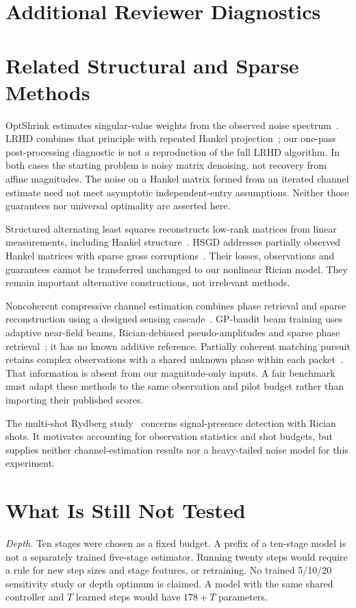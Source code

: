 \documentclass[journal]{IEEEtran}
\begin{document}
\section{Additional Reviewer Diagnostics}


\section{Related Structural and Sparse Methods}
OptShrink estimates singular-value weights from the observed noise
spectrum~\cite{nadakuditi2014}. LRHD combines that principle with
repeated Hankel projection~\cite{yin2021}; our one-pass post-processing
diagnostic is not a reproduction of the full LRHD algorithm. In both
cases the starting problem is noisy matrix denoising, not recovery from
affine magnitudes. The noise on a Hankel matrix formed from an iterated
channel estimate need not meet asymptotic independent-entry assumptions.
Neither those guarantees nor universal optimality are asserted here.

Structured alternating least squares reconstructs low-rank matrices from
linear measurements, including Hankel structure~\cite{zachariah2012}.
HSGD addresses partially observed Hankel matrices with sparse gross
corruptions~\cite{cai2023}. Their losses, observations and guarantees
cannot be transferred unchanged to our nonlinear Rician model. They
remain important alternative constructions, not irrelevant methods.

Noncoherent compressive channel estimation combines phase retrieval and
sparse reconstruction using a designed sensing cascade~\cite{rasekh2018}.
GP-bandit beam training uses adaptive near-field beams, Rician-debiased
pseudo-amplitudes and sparse phase retrieval~\cite{wang2026}; it has no
known additive reference. Partially coherent matching pursuit retains
complex observations with a shared unknown phase within each
packet~\cite{yi2024}. That information is absent from our magnitude-only
inputs. A fair benchmark must adapt these methods to the same observation
and pilot budget rather than importing their published scores.

The multi-shot Rydberg study~\cite{atapattu2026} concerns signal-presence
detection with Rician shots. It motivates accounting for observation
statistics and shot budgets, but supplies neither channel-estimation
results nor a heavy-tailed noise model for this experiment.

\section{What Is Still Not Tested}
\textit{Depth.} Ten stages were chosen as a fixed budget. A prefix of a
ten-stage model is not a separately trained five-stage estimator. Running
twenty steps would require a rule for new step sizes and stage features,
or retraining. No trained 5/10/20 sensitivity study or depth optimum is
claimed. A model with the same shared controller and $T$ learned steps
would have $178+T$ parameters.
\end{document}
